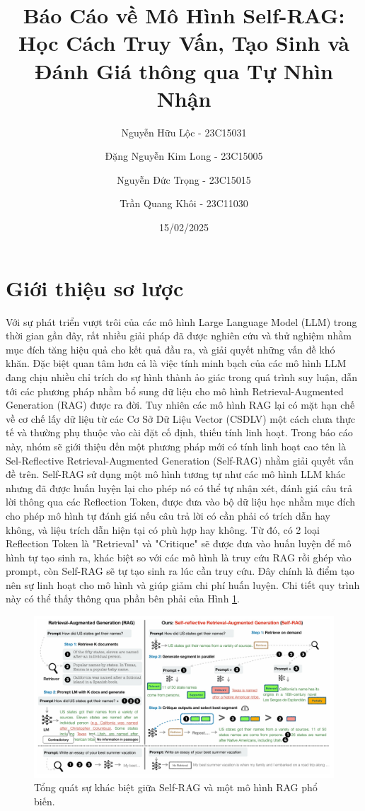 \documentclass{article}
\title{Báo Cáo về Mô Hình Self-RAG: Học Cách Truy Vấn, Tạo Sinh và Đánh Giá thông qua Tự Nhìn Nhận}
\author{Nguyễn Hữu Lộc - 23C15031 \and Đặng Nguyễn Kim Long - 23C15005 \and Nguyễn Đức Trọng - 23C15015 \and Trần Quang Khôi - 23C11030}
\date{15/02/2025}
\begin{document}
\maketitle

\tableofcontents


\section{Giới thiệu sơ lược}
Với sự phát triển vượt trôi của các mô hình Large Language Model (LLM) trong thời gian gần đây, rất nhiều giải pháp đã được nghiên cứu và thử nghiệm nhằm mục đích tăng hiệu quả cho kết quả đầu ra, và giải quyết những vấn đề khó khăn. Đặc biệt quan tâm hơn cả là việc tính minh bạch của các mô hình LLM đang chịu nhiều chỉ trích do sự hình thành ảo giác trong quá trình suy luận, dẫn tới các phương pháp nhằm bổ sung dữ liệu cho mô hình Retrieval-Augmented Generation (RAG) được ra đời. Tuy nhiên các mô hình RAG lại có mặt hạn chế về cơ chế lấy dữ liệu từ các Cơ Sở Dữ Liệu Vector (CSDLV) một cách chưa thực tế và thường phụ thuộc vào cài đặt cố định, thiếu tính linh hoạt. Trong báo cáo này, nhóm sẽ giới thiệu đến một phương pháp mới có tính linh hoạt cao tên là Sel-Reflective Retrieval-Augmented Generation (Self-RAG) nhằm giải quyết vấn đề trên. Self-RAG sử dụng một mô hình tương tự như các mô hình LLM khác nhưng đã được huấn luyện lại cho phép nó có thể tự nhận xét, đánh giá câu trả lời thông qua các Reflection Token, được đưa vào bộ dữ liệu học nhằm mục đích cho phép mô hình tự đánh giá nếu câu trả lời có cần phải có trích dẫn hay không, và liệu trích dẫn hiện tại có phù hợp hay không. Từ đó, có 2 loại Reflection Token là "Retrieval" và "Critique" sẽ được đưa vào huấn luyện để mô hình tự tạo sinh ra, khác biệt so với các mô hình là truy cứu RAG rồi ghép vào prompt, còn Self-RAG sẽ tự tạo sinh ra lúc cần truy cứu. Đây chính là điểm tạo nên sự linh hoạt cho mô hình và giúp giảm chi phí huấn luyện. Chi tiết quy trình này có thể thấy thông qua phần bên phải của Hình \ref{fig:overview_self_rag}.

\begin{figure} 
    \centering
    \includegraphics[scale = 0.2]{overview_self_rag.jpeg}
    \caption{Tổng quát sự khác biệt giữa Self-RAG và một mô hình RAG phổ biến.}
    \label{fig:overview_self_rag}
\end{figure}
\end{document}

